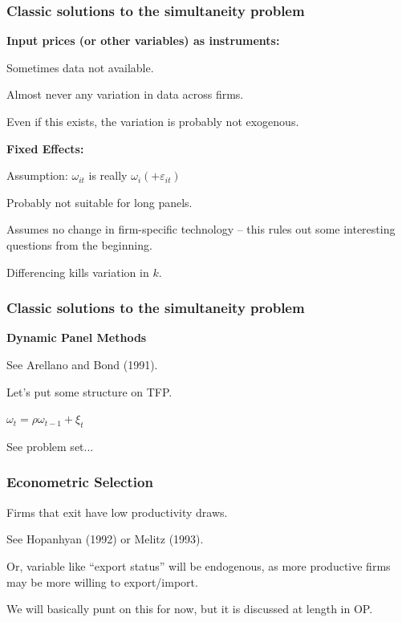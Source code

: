 \documentclass[11pt, aspectratio=169]{beamer}
\newenvironment{wideitemize}{\itemize\addtolength{\itemsep}{10pt}}{\enditemize}
\begin{document}
\begin{frame}[c]\frametitle{Classic solutions to the simultaneity problem}
    
\textbf{Input prices (or other variables) as instruments:}
\begin{wideitemize}
	\item Sometimes data not available.
	\item Almost never any variation in data across firms. 
	\item Even if this exists, the variation is probably not exogenous. 
\end{wideitemize}

\bigskip
\textbf{Fixed Effects:}
\begin{wideitemize}
	\item Assumption: $\omega_{it}$ is really $\omega_{i} (+\varepsilon_{it})$
	\item Probably not suitable for long panels. 
	\item Assumes no change in firm-specific technology -- this rules out some interesting questions from the beginning. 
	\item Differencing kills variation in $k$.
\end{wideitemize}

\end{frame}


\begin{frame}[c]\frametitle{Classic solutions to the simultaneity problem}
    
\textbf{Dynamic Panel Methods}
\begin{wideitemize}
	\item See Arellano and Bond (1991).
	\item Let's put some structure on TFP. 
	\item $\omega_t = \rho \omega_{t-1} + \xi_t$
	\item See problem set...
\end{wideitemize}


\end{frame}


\begin{frame}[c]\frametitle{Econometric Selection}
    
\begin{wideitemize}
	\item Firms that exit have low productivity draws. 
	\begin{wideitemize}
		\item See Hopanhyan (1992) or Melitz (1993).
	\end{wideitemize}	
	\item Or, variable like ``export status'' will be endogenous, as more productive firms may be more willing to export/import.
	\item We will basically punt on this for now, but it is discussed at length in OP. 
\end{wideitemize}

\end{frame}
\end{document}

